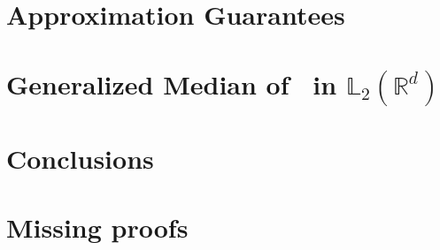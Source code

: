 \documentclass[11pt]{article} %
\begin{document}
\section{Approximation Guarantees}
\label{sec:approx}


\section{Generalized Median of~\cite{AgrawalBGTX22} in $\mathbb{L}_2(\mathbb{R}^d)$}
\label{sec:prediction}


\section{Conclusions}
\label{sec:conclusions}



% 

% 

% 

% 

%



\appendix

\section{Missing proofs}
\label{sec:appendix}

\end{document}
